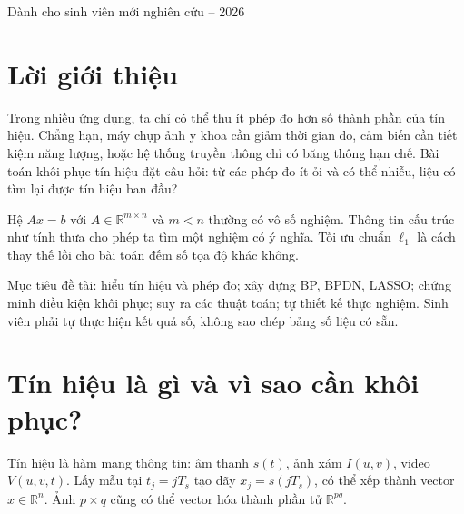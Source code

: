 \documentclass[12pt,a4paper]{article}
\newcommand{\R}{\mathbb R}\newcommand{\supp}{\operatorname{supp}}\newcommand{\spark}{\operatorname{spark}}
\begin{document}
\begin{titlepage}\centering\vspace*{3cm}{\Large HƯỚNG DẪN ĐỒ ÁN TOÁN ỨNG DỤNG\par}\vspace{1.5cm}{\Huge\bfseries ĐỀ TÀI 5\par}\vspace{1cm}{\LARGE KHÔI PHỤC TÍN HIỆU THƯA BẰNG CỰC TIỂU HÓA CHUẨN $\ell_1$\par}\vspace{1.5cm}{\large Cơ sở lý thuyết -- Điều kiện khôi phục -- Thuật toán -- Hội tụ\par}\vfill{\large Dành cho sinh viên mới nghiên cứu -- 2026\par}\end{titlepage}
\tableofcontents\clearpage
\section{Lời giới thiệu}
Trong nhiều ứng dụng, ta chỉ có thể thu ít phép đo hơn số thành phần của tín hiệu. Chẳng hạn, máy chụp ảnh y khoa cần giảm thời gian đo, cảm biến cần tiết kiệm năng lượng, hoặc hệ thống truyền thông chỉ có băng thông hạn chế. Bài toán khôi phục tín hiệu đặt câu hỏi: từ các phép đo ít ỏi và có thể nhiễu, liệu có tìm lại được tín hiệu ban đầu?

Hệ $Ax=b$ với $A\in\R^{m\times n}$ và $m<n$ thường có vô số nghiệm. Thông tin cấu trúc như tính thưa cho phép ta tìm một nghiệm có ý nghĩa. Tối ưu chuẩn $\ell_1$ là cách thay thế lồi cho bài toán đếm số tọa độ khác không.

Mục tiêu đề tài: hiểu tín hiệu và phép đo; xây dựng BP, BPDN, LASSO; chứng minh điều kiện khôi phục; suy ra các thuật toán; tự thiết kế thực nghiệm. Sinh viên phải tự thực hiện kết quả số, không sao chép bảng số liệu có sẵn.
\clearpage
\section{Tín hiệu là gì và vì sao cần khôi phục?}
Tín hiệu là hàm mang thông tin: âm thanh $s(t)$, ảnh xám $I(u,v)$, video $V(u,v,t)$. Lấy mẫu tại $t_j=jT_s$ tạo dãy $x_j=s(jT_s)$, có thể xếp thành vector $x\in\R^n$. Ảnh $p\times q$ cũng có thể vector hóa thành phần tử $\R^{pq}$.

\begin{center}\end{center}
\end{document}
